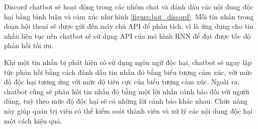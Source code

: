 Discord chatbot sẽ hoạt động trong các nhóm chat và đánh dấu các nội dung độc hại bằng bình luận và cảm xúc như hình \ref{figure:bot_discord}. Mỗi tin nhắn trong đoạn hội thoại sẽ được gửi đến máy chủ API để phân tích, vì là ứng dụng cho tin nhắn liên tục nên chatbot sẽ sử dụng API của mô hình RNN để đạt được tốc độ phản hồi tối ưu.

Khi một tin nhắn bị phát hiện có sử dụng ngôn ngữ độc hại, chatbot sẽ ngay lập tức phản hồi bằng cách đánh dấu tin nhắn đó bằng biểu tượng cảm xúc, với mức độ độc hại tương ứng với mức độ tiêu cực của biểu tượng cảm xúc. Ngoài ra, chatbot cũng sẽ phản hồi tin nhắn đó bằng một lời nhắn cảnh báo đối với người dùng, tuỳ theo mức độ độc hại sẽ có những lời cảnh báo khác nhau. Chức năng này giúp quản trị viên có thể kiểm soát thành viên và xử lý các nội dung độc hại một cách hiệu quả.